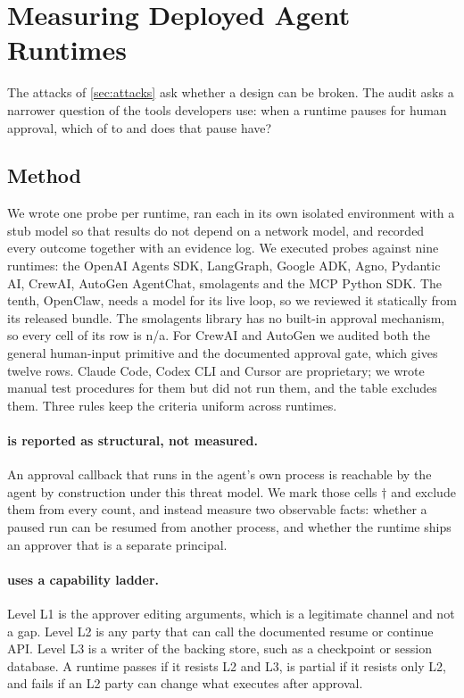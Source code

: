 \section{Measuring Deployed Agent Runtimes}\label{sec:audit}

The attacks of \cref{sec:attacks} ask whether a design can be broken. The audit asks a narrower question of
the tools developers use: when a runtime pauses for human approval, which of  to  and
 does that pause have?

\subsection{Method}

We wrote one probe per runtime, ran each in its own isolated environment with a stub model so that results do not
depend on a network model, and recorded every outcome together with an evidence log. We executed probes against nine
runtimes: the OpenAI Agents SDK, LangGraph, Google ADK, Agno, Pydantic AI, CrewAI, AutoGen AgentChat, smolagents
and the MCP Python SDK. The tenth, OpenClaw, needs a model for its live loop, so we reviewed it statically from
its released bundle. The smolagents library has no built-in approval mechanism, so every cell of its row is n/a. For CrewAI and AutoGen we audited both the general human-input primitive and the documented
approval gate, which gives twelve rows. Claude Code, Codex CLI and Cursor are proprietary; we wrote manual test
procedures for them but did not run them, and the table excludes them. Three rules keep the criteria uniform
across runtimes.

\paragraph{ is reported as structural, not measured.} An approval callback that runs in the agent's own
process is reachable by the agent by construction under this threat model. We mark those cells $\dagger$ and
exclude them from every count, and instead measure two observable facts: whether a paused run can be resumed from
another process, and whether the runtime ships an approver that is a separate principal.

\paragraph{ uses a capability ladder.} Level L1 is the approver editing arguments, which is a legitimate
channel and not a gap. Level L2 is any party that can call the documented resume or continue API. Level L3 is a
writer of the backing store, such as a checkpoint or session database. A runtime passes if it resists L2 and L3,
is partial if it resists only L2, and fails if an L2 party can change what executes after approval.

